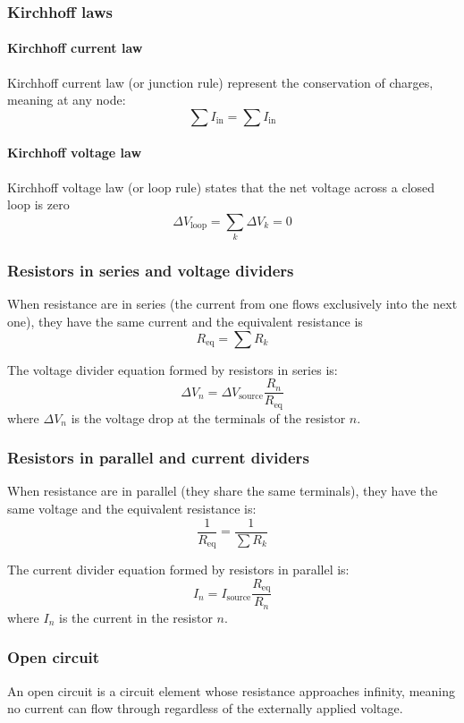 \documentclass[10pt, twocolumn]{article}
\begin{document}
\subsubsection{Kirchhoff laws}
\paragraph{Kirchhoff current law}
Kirchhoff current law (or junction rule) represent the conservation of charges, meaning at any node:
\[
  \sum{I_\mathrm{in}} = \sum{I_\mathrm{in}}
\]


\paragraph{Kirchhoff voltage law}
Kirchhoff voltage law (or loop rule) states that the net voltage across a closed loop is zero
\[
  \Delta V_{\mathrm{loop}} = \sum_k {\Delta V_k } = 0
\]


\subsubsection{Resistors in series and voltage dividers}
When resistance are in series (the current from one flows exclusively into the next one), they have the same current and the equivalent resistance is
\[
  R_\mathrm{eq} = \sum{R_k}
\]

The voltage divider equation formed by resistors in series is:
\[
  \Delta V_n = \Delta V_\mathrm{source} \frac{R_n}{R_\mathrm{eq}}
\]
where \(\Delta V_n\) is the voltage drop at the terminals of the resistor \(n\).


\subsubsection{Resistors in parallel and current dividers}
When resistance are in parallel (they share the same terminals), they have the same voltage and the equivalent resistance is:
\[
  \frac{1}{R_\mathrm{eq}} = \frac{1}{\sum{R_k}}
\]

The current divider equation formed by resistors in parallel is:
\[
  I_n = I_\mathrm{source} \frac{R_\mathrm{eq}}{R_n}
\]
where \(I_n\) is the current in the resistor \(n\).


\subsubsection{Open circuit}
An open circuit is a circuit element whose resistance approaches infinity, meaning no current can flow through regardless of the externally applied voltage.
\end{document}

